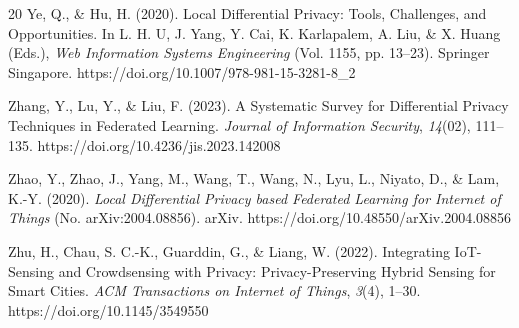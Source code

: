 \documentclass[conference]{IEEEtran}
\begin{document}
\begin{thebibliography}{20}
Ye, Q., \& Hu, H. (2020). Local Differential Privacy: Tools, Challenges, and Opportunities. In L. H. U, J. Yang, Y. Cai, K. Karlapalem, A. Liu, \& X. Huang (Eds.), \emph{Web Information Systems Engineering} (Vol. 1155, pp. 13--23). Springer Singapore. https://doi.org/10.1007/978-981-15-3281-8\_2

Zhang, Y., Lu, Y., \& Liu, F. (2023). A Systematic Survey for Differential Privacy Techniques in Federated Learning. \emph{Journal of Information Security}, \emph{14}(02), 111--135. https://doi.org/10.4236/jis.2023.142008

Zhao, Y., Zhao, J., Yang, M., Wang, T., Wang, N., Lyu, L., Niyato, D., \& Lam, K.-Y. (2020). \emph{Local Differential Privacy based Federated Learning for Internet of Things} (No. arXiv:2004.08856). arXiv. https://doi.org/10.48550/arXiv.2004.08856

Zhu, H., Chau, S. C.-K., Guarddin, G., \& Liang, W. (2022). Integrating IoT-Sensing and Crowdsensing with Privacy: Privacy-Preserving Hybrid Sensing for Smart Cities. \emph{ACM Transactions on Internet of Things}, \emph{3}(4), 1--30. https://doi.org/10.1145/3549550

\end{thebibliography}
\end{document}
